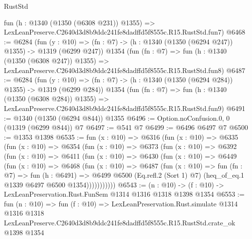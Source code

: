 \begin{lexlean}{RustStd}
\begin{coremodule}
    fun (h : @1340 (@1350 (@6308 @231)) @1355) =>
    LexLeanPreserve.C2640d3d8b9ddc241fe8dadffd5f8555c.R15.RustStd.fun7)
@6468 := @6284
    (fun (y : @10) => (fn : @7) -> (h : @1340 (@1350 (@6294 @247)) @1355) -> @1319 (@6299 @247))
    @1354
    (fun (fn : @7) =>
    fun (h : @1340 (@1350 (@6308 @247)) @1355) =>
    LexLeanPreserve.C2640d3d8b9ddc241fe8dadffd5f8555c.R15.RustStd.fun8)
@6487 := @6284
    (fun (y : @10) => (fn : @7) -> (h : @1340 (@1350 (@6294 @284)) @1355) -> @1319 (@6299 @284))
    @1354
    (fun (fn : @7) =>
    fun (h : @1340 (@1350 (@6308 @284)) @1355) =>
    LexLeanPreserve.C2640d3d8b9ddc241fe8dadffd5f8555c.R15.RustStd.fun9)
@6491 := @1340 (@1350 (@6294 @844)) @1355
@6496 := Option.noConfusion.{0, 0} (@1319 (@6299 @844)) @7
@6497 := @541 @7
@6499 := @6496 @6497 @7
@6500 := @1353 @1398
@6535 := fun (x : @10) =>
  @6316
    (fun (x : @10) =>
    @6335
      (fun (x : @10) =>
      @6354
        (fun (x : @10) =>
        @6373
          (fun (x : @10) =>
          @6392
            (fun (x : @10) =>
            @6411
              (fun (x : @10) =>
              @6430
                (fun (x : @10) =>
                @6449
                  (fun (x : @10) =>
                  @6468
                    (fun (x : @10) =>
                    @6487
                      (fun (x : @10) =>
                      fun (fn : @7) =>
                      fun (h : @6491) =>
                      @6499
                        @6500
                        (Eq.refl.{2} (Sort 1) @7)
                        (heq_of_eq.{1} @1339 @6497 @6500 @1354)))))))))))
@6543 := (n : @10) -> (f : @10) -> LexLeanPreservation.Rust.FunSem @1314 @1316 @1318 @1398 @1354
@6553 := fun (n : @10) =>
  fun (f : @10) =>
  LexLeanPreservation.Rust.simulate
    @1314
    @1316
    @1318
    LexLeanPreserve.C2640d3d8b9ddc241fe8dadffd5f8555c.R15.RustStd.crate_ok
    @1398
    @1354
\end{coremodule}
\end{lexlean}
